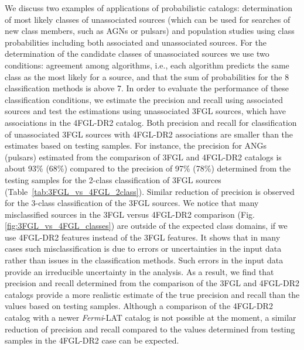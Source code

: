\documentclass{aa}
\newcommand{\Fermi}{\textit{Fermi}\xspace}
\begin{document}
We discuss two examples of applications of probabilistic catalogs: determination of most likely classes of unassociated sources (which can be used for searches of new class members, such as AGNs or pulsars) and population studies using class probabilities including both associated and unassociated sources.
For the determination of the candidate classes of unassociated sources we use two conditions: agreement among algorithms, i.e., each algorithm predicts the same class as the most likely for a source, and that the sum of probabilities for the 8 classification methods is above 7.
In order to evaluate the performance of these classification conditions, we estimate the precision and recall using associated sources and test the estimations using unassociated 3FGL sources, which have associations in the 4FGL-DR2 catalog.
Both precision and recall for classification of unassociated 3FGL sources with 4FGL-DR2 associations 
are smaller than the estimates based on testing samples.
For instance, the precision for ANGs (pulsars) estimated from the comparison of 3FGL and 4FGL-DR2 catalogs is about 93\% (68\%)
compared to the precision of 97\% (78\%) determined from the testing samples for the 2-class classification of 3FGL sources (Table~\ref{tab:3FGL_vs_4FGL_2class}).
Similar reduction of precision is observed for the 3-class classification of the 3FGL sources.
We notice that many misclassified sources in the 3FGL versus 4FGL-DR2 comparison (Fig. \ref{fig:3FGL_vs_4FGL_classes}) are outside of the expected class domains, if we use 4FGL-DR2 features instead of the 3FGL features. It shows that in many cases such misclassification is due to errors or uncertainties in the input data rather than issues in the classification methods. Such errors in the input data provide an irreducible uncertainty in the analysis. As a result, we find that precision and recall determined from the comparison of the 3FGL and 4FGL-DR2 catalogs provide a more realistic estimate of the true precision and recall than the values based on testing samples.
Although a comparison of the 4FGL-DR2 catalog with a newer \Fermi-LAT catalog is not possible at the moment, 
a similar reduction of precision and recall compared to the values determined from testing samples in the 4FGL-DR2 case can be expected.
\end{document}
